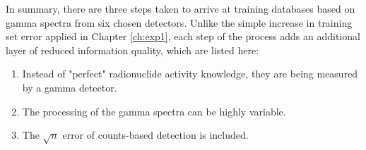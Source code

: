 In summary, there are three steps taken to arrive at training databases based on
gamma spectra from six chosen detectors. Unlike the simple increase in training
set error applied in Chapter \ref{ch:exp1}, each step of the process adds an
additional layer of reduced information quality, which are listed here:
\begin{enumerate}
  \item Instead of "perfect" radionuclide activity knowledge, they are being 
        measured by a gamma detector.
  \item The processing of the gamma spectra can be highly variable.
  \item The $\sqrt{n}$ error of counts-based detection is included. 
\end{enumerate}

